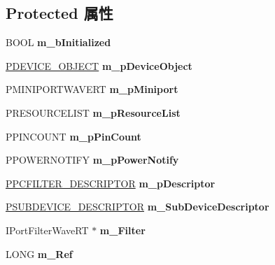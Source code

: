 \subsection*{Protected 属性}
\begin{DoxyCompactItemize}
\item 
\mbox{\label{class_c_port_wave_r_t_a006e9569fb34b62873501a80313257bb}} 
B\+O\+OL {\bfseries m\+\_\+b\+Initialized}
\item 
\mbox{\label{class_c_port_wave_r_t_ac0b366587375ca85a769602986115590}} 
\hyperlink{struct___d_e_v_i_c_e___o_b_j_e_c_t}{P\+D\+E\+V\+I\+C\+E\+\_\+\+O\+B\+J\+E\+CT} {\bfseries m\+\_\+p\+Device\+Object}
\item 
\mbox{\label{class_c_port_wave_r_t_aac9896b222c7b53aad1c36ae9d447724}} 
P\+M\+I\+N\+I\+P\+O\+R\+T\+W\+A\+V\+E\+RT {\bfseries m\+\_\+p\+Miniport}
\item 
\mbox{\label{class_c_port_wave_r_t_a0e4c8ed340c305a4f8188bd070c552a7}} 
P\+R\+E\+S\+O\+U\+R\+C\+E\+L\+I\+ST {\bfseries m\+\_\+p\+Resource\+List}
\item 
\mbox{\label{class_c_port_wave_r_t_a9fe1e67e731d6d15e3de5260267ef11c}} 
P\+P\+I\+N\+C\+O\+U\+NT {\bfseries m\+\_\+p\+Pin\+Count}
\item 
\mbox{\label{class_c_port_wave_r_t_a3ed7a7accc55d32a91bdd5086bedb01f}} 
P\+P\+O\+W\+E\+R\+N\+O\+T\+I\+FY {\bfseries m\+\_\+p\+Power\+Notify}
\item 
\mbox{\label{class_c_port_wave_r_t_acf91a34ad675d4f34b3a91d8c6ed276a}} 
\hyperlink{struct_p_c_f_i_l_t_e_r___d_e_s_c_r_i_p_t_o_r}{P\+P\+C\+F\+I\+L\+T\+E\+R\+\_\+\+D\+E\+S\+C\+R\+I\+P\+T\+OR} {\bfseries m\+\_\+p\+Descriptor}
\item 
\mbox{\label{class_c_port_wave_r_t_af44ba2216c47c917e5e73b461ac1a6c7}} 
\hyperlink{struct_s_u_b_d_e_v_i_c_e___d_e_s_c_r_i_p_t_o_r}{P\+S\+U\+B\+D\+E\+V\+I\+C\+E\+\_\+\+D\+E\+S\+C\+R\+I\+P\+T\+OR} {\bfseries m\+\_\+\+Sub\+Device\+Descriptor}
\item 
\mbox{\label{class_c_port_wave_r_t_aefb5c4ad4f51c7268e3619d124122316}} 
I\+Port\+Filter\+Wave\+RT $\ast$ {\bfseries m\+\_\+\+Filter}
\item 
\mbox{\label{class_c_port_wave_r_t_ad258a2a723299097afb0ba7311e0a861}} 
L\+O\+NG {\bfseries m\+\_\+\+Ref}
\end{DoxyCompactItemize}
